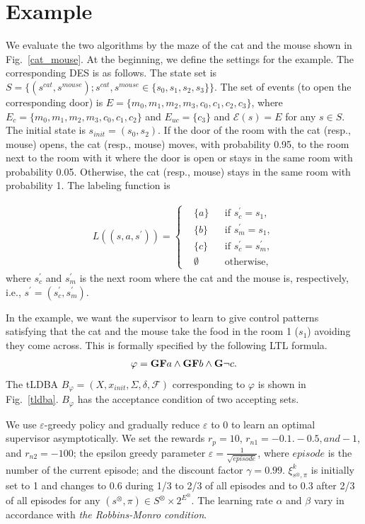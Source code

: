 \documentclass[a4j,12pt,oneside,openany,english,dvipdfmx]{jsbook}
\begin{document}
\section{Example}
We evaluate the two algorithms by the maze of the cat and the mouse shown in Fig.\ \ref{cat_mouse}. At the beginning, we define the settings for the example. The corresponding DES is as follows. The state set is $S = \{ (s^{cat}, s^{mouse}) ; s^{cat},s^{mouse} \in \{ s_0,s_1,s_2,s_3 \} \}$. The set of events (to open the corresponding door) is $E = \{ m_0, m_1, m_2, m_3, c_0, c_1, c_2, c_3 \}$, where $E_{c} = \{ m_0, m_1, m_2, m_3, c_0, c_1, c_2 \}$ and $E_{uc} = \{ c_3 \}$ and $\mathcal{E}(s) = E$ for any $s \in S$. The initial state is $s_{init} = (s_0, s_2)$. If the door of the room with the cat (resp., mouse) opens, the cat (resp., mouse) moves, with probability 0.95, to the room next to the room with it where the door is open or stays in the same room with probability 0.05. Otherwise, the cat (resp., mouse) stays in the same room with probability 1. The labeling function is

\begin{align}
   L((s, a, s^{\prime})) =
    \left\{
    \begin{aligned}
      & \{ a \} &  & \text{if }s_c^{\prime} = s_1, \nonumber \\
      & \{ b \} &  & \text{if }s_m^{\prime} = s_1, \nonumber \\
      & \{ c \} &  & \text{if }s_c^{\prime} = s_m^{\prime}, \nonumber \\
      & \emptyset &  & \text{otherwise},
    \end{aligned}
    \right.
\end{align}
where $s_c^{\prime}$ and $s_m^{\prime}$ is the next room where the cat and the mouse is, respectively, i.e., $s^{\prime} = (s_c^{\prime},s_m^{\prime})$.

In the example, we want the supervisor to learn to give control patterns satisfying that the cat and the mouse take the food in the room 1 ($s_1$) avoiding they come across. This is formally specified by the following LTL formula.
\begin{align*}
  \varphi = \text{{\bf GF}}a \wedge \text{{\bf GF}}b \wedge \text{{\bf G}}\neg c.
\end{align*}
The tLDBA $B_{\varphi} = (X, x_{init},\Sigma,\delta,\mathcal{F})$ corresponding to $\varphi$ is shown in Fig.\ \ref{tldba}. $B_{\varphi}$ has the acceptance condition of two accepting sets.

We use $\varepsilon$-greedy policy and gradually reduce $\varepsilon$ to 0 to learn an optimal supervisor asymptotically.
We set the rewards $r_p = 10$, $r_{n1} = -0.1. -0.5, and -1$, and $r_{n2} = -100$; the epsilon greedy parameter $ \varepsilon = \frac{1}{ \sqrt{episode} }$, where $episode$ is the number of the current episode; and the discount factor $\gamma = 0.99$. $\xi^k_{s^{\otimes},\pi}$ is initially set to 1 and changes to 0.6 during 1/3 to 2/3 of all episodes and to 0.3 after 2/3 of all episodes for any $(s^{\otimes},\pi) \in S^{\otimes} \times 2^{E^{\otimes}}$. The learning rate $\alpha$ and $\beta$ vary in accordance with {\it the Robbins-Monro condition}.
\end{document}

